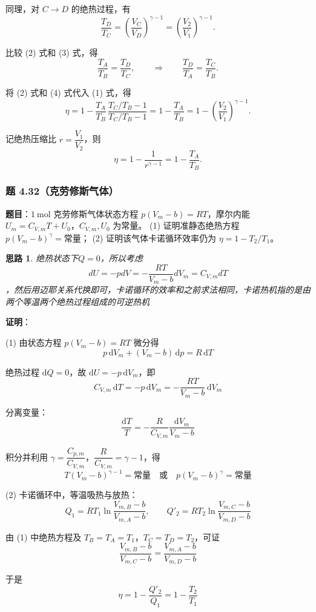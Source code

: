 \documentclass[UTF8]{ctexart}
\newtheorem{thoughts}{思路}[subsection]
\begin{document}
同理，对 $C\to D$ 的绝热过程，有
\[
\frac{T_D}{T_C}=\left(\frac{V_C}{V_D}\right)^{\gamma-1}
=\left(\frac{V_2}{V_1}\right)^{\gamma-1}.
\tag{3}
\]

比较 (2) 式和 (3) 式，得
\[
\frac{T_A}{T_B}=\frac{T_D}{T_C},
\qquad\Longrightarrow\qquad
\frac{T_D}{T_A}=\frac{T_C}{T_B}.
\tag{4}
\]

将 (2) 式和 (4) 式代入 (1) 式，得
\[
\eta=1-\frac{T_A}{T_B}\,\frac{T_C/T_B-1}{T_C/T_B-1}
=1-\frac{T_A}{T_B}
=1-\left(\frac{V_2}{V_1}\right)^{\gamma-1}.
\]

记绝热压缩比 $r=\dfrac{V_1}{V_2}$，则
\[
\boxed{\eta=1-\frac{1}{r^{\gamma-1}}=1-\frac{T_A}{T_B}}.
\]

\subsubsection{题 4.32（克劳修斯气体）}

\textbf{题目}：$1\ \mathrm{mol}$ 克劳修斯气体状态方程 $p(V_m-b)=RT$，摩尔内能 $U_m=C_{V,m}T+U_0$，$C_{V,m},U_0$ 为常量。
(1) 证明准静态绝热方程 $p(V_m-b)^{\gamma}=\text{常量}$；
(2) 证明该气体卡诺循环效率仍为 $\eta=1-T_2/T_1$。

\begin{thoughts}
  绝热状态下$Q=0$，所以考虑$$dU = -pdV = -\frac{RT}{V_m-b}dV_m = C_{V,m}dT$$，然后用迈耶关系代换即可，卡诺循环的效率和之前求法相同，卡诺热机指的是由两个等温两个绝热过程组成的可逆热机
\end{thoughts}

\textbf{证明}：

(1) 由状态方程 $p(V_m-b)=RT$ 微分得
\[
p\,\mathrm{d}V_m+(V_m-b)\,\mathrm{d}p=R\,\mathrm{d}T
\]

绝热过程 $\mathrm{d}Q=0$，故 $\mathrm{d}U=-p\,\mathrm{d}V_m$，即
\[
C_{V,m}\,\mathrm{d}T=-p\,\mathrm{d}V_m
=-\frac{RT}{V_m-b}\,\mathrm{d}V_m
\]

分离变量：
\[
\frac{\mathrm{d}T}{T}=-\frac{R}{C_{V,m}}\frac{\mathrm{d}V_m}{V_m-b}
\]

积分并利用 $\gamma=\dfrac{C_{p,m}}{C_{V,m}}$，$\dfrac{R}{C_{V,m}}=\gamma-1$，得
\[
\boxed{T(V_m-b)^{\gamma-1}=\text{常量}}
\quad\text{或}\quad
\boxed{p(V_m-b)^{\gamma}=\text{常量}}
\]

(2) 卡诺循环中，等温吸热与放热：
\[
Q_1=RT_1\ln\frac{V_{m,B}-b}{V_{m,A}-b},\qquad
Q'_2=RT_2\ln\frac{V_{m,C}-b}{V_{m,D}-b}
\]

由 (1) 中绝热方程及 $T_B=T_A=T_1$，$T_C=T_D=T_2$，可证
\[
\frac{V_{m,B}-b}{V_{m,C}-b}=\frac{V_{m,A}-b}{V_{m,D}-b}
\]

于是
\[
\boxed{\eta=1-\frac{Q'_2}{Q_1}=1-\frac{T_2}{T_1}}
\]
\end{document}
